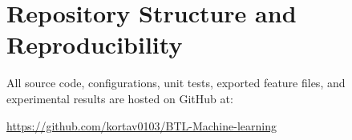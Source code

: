 \documentclass[12pt,a4paper]{article}
\begin{document}
\clearpage
{}



\clearpage
\appendix

\section{Repository Structure and Reproducibility}
\label{app:repo}

All source code, configurations, unit tests, exported feature files, and experimental results are hosted on GitHub at:
\begin{center}
  \url{https://github.com/kortav0103/BTL-Machine-learning}
\end{center}
\end{document}
